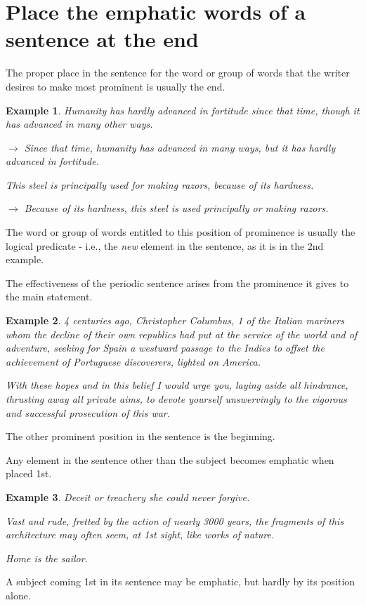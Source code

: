 \documentclass{book}
\numberwithin{equation}{section}
\newtheorem{example}{Example}[chapter]
\begin{document}
\section{Place the emphatic words of a sentence at the end}
The proper place in the sentence for the word or group of words that the writer desires to make most prominent is usually the end.
\begin{example}
    Humanity has hardly advanced in fortitude since that time, though it has advanced in many other ways.
    
    $\to$ Since that time, humanity has advanced in many ways, but it has hardly advanced in fortitude.
    
    This steel is principally used for making razors, because of its hardness.
    
    $\to$ Because of its hardness, this steel is used principally or making razors.
\end{example}
The word or group of words entitled to this position of prominence is usually the logical predicate - i.e., the \textit{new} element in the sentence, as it is in the 2nd example.

The effectiveness of the periodic sentence arises from the prominence it gives to the main statement.
\begin{example}
    4 centuries ago, Christopher Columbus, 1 of the Italian mariners whom the decline of their own republics had put at the service of the world and of adventure, seeking for Spain a westward passage to the Indies to offset the achievement of Portuguese discoverers, lighted on America.
    
    With these hopes and in this belief I would urge you, laying aside all hindrance, thrusting away all private aims, to devote yourself unswervingly to the vigorous and successful prosecution of this war.
\end{example}
The other prominent position in the sentence is the beginning.

Any element in the sentence other than the subject becomes emphatic when placed 1st.
\begin{example}
    Deceit or treachery she could never forgive.
    
    Vast and rude, fretted by the action of nearly 3000 years, the fragments of this architecture may often seem, at 1st sight, like works of nature.
    
    Home is the sailor.
\end{example}
A subject coming 1st in its sentence may be emphatic, but hardly by its position alone.
\end{document}
